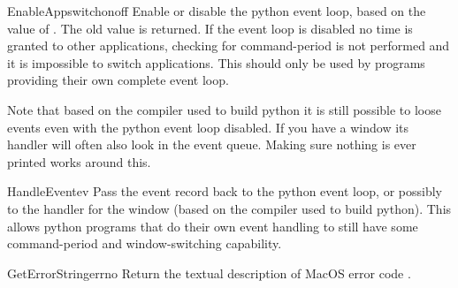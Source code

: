 \begin{funcdesc}{EnableAppswitch}{onoff}
Enable or disable the python event loop, based on the value of
. The old value is returned. If the event loop is disabled
no time is granted to other applications, checking for command-period
is not performed and it is impossible to switch applications. This
should only be used by programs providing their own complete event
loop.

Note that based on the compiler used to build python it is still
possible to loose events even with the python event loop disabled. If
you have a  window its handler will often also look
in the event queue. Making sure nothing is ever printed works around
this.
\end{funcdesc}

\begin{funcdesc}{HandleEvent}{ev}
Pass the event record  back to the python event loop, or
possibly to the handler for the  window (based on the
compiler used to build python). This allows python programs that do
their own event handling to still have some command-period and
window-switching capability.
\end{funcdesc}

\begin{funcdesc}{GetErrorString}{errno}
Return the textual description of MacOS error code .
\end{funcdesc}
